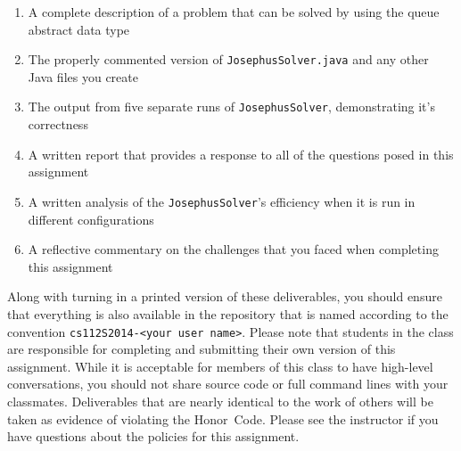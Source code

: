   \begin{enumerate} 
  \itemsep0pt

  \item A complete description of a problem that can be solved by using the queue abstract data type

  \item The properly commented version of {\tt JosephusSolver.java} and any other Java files you create

  \item The output from five separate runs of {\tt JosephusSolver}, demonstrating it's correctness 

  \item A written report that provides a response to all of the questions posed in this assignment

  \item A written analysis of the {\tt JosephusSolver}'s efficiency when it is run in different configurations 

  \item A reflective commentary on the challenges that you faced when completing this assignment 
   
  \end{enumerate}

  Along with turning in a printed version of these deliverables, you should ensure that everything is also available in
  the repository that is named according to the convention {\tt cs112S2014-<your user name>}. Please note that students
  in the class are responsible for completing and submitting their own version of this assignment.    While it is
  acceptable for members of this class to have high-level conversations, you should not share source code or full
  command lines with your classmates.  Deliverables that are nearly identical to the work of others will be taken as
  evidence of violating the \mbox{Honor Code}.  Please see the instructor if you have questions about the policies for
  this assignment.

  
